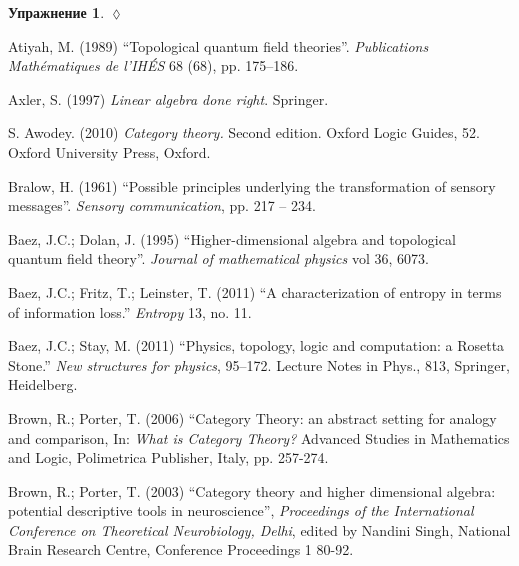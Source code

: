 \documentclass[a4paper]{book}
\def\rr{\raggedright}
\theoremstyle{myth}
\newtheorem{excRUS}[envRUS]{Упражнение}
\newenvironment{exerciseRUS}{\begin{excRUS}}{\hspace*{\fill}$\lozenge$\end{excRUS}}
\begin{document}
\begin{russian}
\begin{exerciseRUS}
 
\end{exerciseRUS}


\printendnotes[custom]


\printindex



\begin{thebibliography}{SGWB}\rr

 Atiyah, M. (1989) “Topological quantum field theories”. {\em Publications Math\'{e}matiques de l'IH\'{E}S} 68 (68), pp. 175--186.

 Axler, S. (1997) {\em Linear algebra done right}. Springer. 

 S. Awodey. (2010) {\em Category theory.} Second edition. Oxford Logic Guides, 52. Oxford University Press, Oxford.

 Bralow, H. (1961) “Possible principles underlying the transformation of sensory messages”. {\em Sensory communication}, pp. 217 -- 234.

 Baez, J.C.; Dolan, J. (1995) “Higher-dimensional algebra and topological quantum field theory”. {\em Journal of mathematical physics} vol 36, 6073.

 Baez, J.C.; Fritz, T.; Leinster, T. (2011) “A characterization of entropy in terms of information loss.” {\em Entropy} 13, no. 11.

 Baez, J.C.; Stay, M. (2011) “Physics, topology, logic and computation: a Rosetta Stone.” {\em New structures for physics}, 95–172. Lecture Notes in Phys., 813, Springer, Heidelberg.

 Brown, R.; Porter, T. (2006) “Category Theory: an abstract setting for
analogy and comparison, In: {\em What is Category Theory?} Advanced
Studies in Mathematics and Logic, Polimetrica Publisher, Italy, pp. 257-274.

 Brown, R.; Porter, T. (2003) “Category theory and higher dimensional
algebra: potential descriptive tools in neuroscience”, {\em Proceedings
of the International Conference on Theoretical Neurobiology, Delhi}, edited by Nandini Singh, National Brain Research
Centre, Conference Proceedings 1 80-92. 


\end{thebibliography}
\end{russian}
\end{document}
